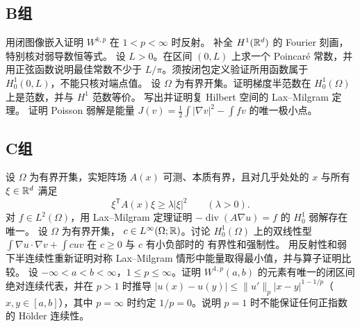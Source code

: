 \subsection*{B组}
\begin{enumerate}[label=\textbf{\thechapter.\arabic*.},resume]
用闭图像嵌入证明 \(W^{k,p}\) 在 \(1<p<\infty\) 时反射。
补全 \(H^1(\mathbb{R}^d)\) 的 Fourier 刻画，特别核对弱导数恒等式。
设 \(L>0\)。在区间 \((0,L)\) 上求一个 Poincaré 常数，并用正弦函数说明最佳常数不少于 \(L/\pi\)。须按闭包定义验证所用函数属于 \(H_0^1(0,L)\)，不能只核对端点值。
设 \(\Omega\) 为有界开集。证明梯度半范数在 \(H_0^1(\Omega)\) 上是范数，并与 \(H^1\) 范数等价。
写出并证明复 Hilbert 空间的 Lax--Milgram 定理。
证明 Poisson 弱解是能量 \(J(v)=\frac12\int|\nabla v|^2-\int fv\) 的唯一极小点。
\end{enumerate}
\subsection*{C组}
\begin{enumerate}[label=\textbf{\thechapter.\arabic*.},resume]
设 \(\Omega\) 为有界开集，实矩阵场 \(A(x)\) 可测、本质有界，且对几乎处处的 \(x\) 与所有 \(\xi\in\mathbb{R}^d\) 满足
\[
 \xi^{\mathsf T}A(x)\xi\ge\lambda|\xi|^2
 \qquad(\lambda>0).
\]
对 \(f\in L^2(\Omega)\)，用 Lax--Milgram 定理证明 \(-\operatorname{div}(A\nabla u)=f\) 的 \(H_0^1\) 弱解存在唯一。
设 \(\Omega\) 为有界开集，
\(c\in L^\infty(\Omega;\mathbb{R})\)。讨论 \(H_0^1(\Omega)\) 上的双线性型
\(\int\nabla u\cdot\nabla v+\int c uv\) 在 \(c\ge0\) 与 \(c\) 有小负部时的
有界性和强制性。
用反射性和弱下半连续性重新证明对称 Lax--Milgram 情形中能量取得最小值，并与算子证明比较。
设 \(-\infty<a<b<\infty\)，\(1\le p\le\infty\)。证明 \(W^{1,p}(a,b)\) 的元素有唯一的闭区间绝对连续代表，并在 \(p>1\) 时推导
\(|u(x)-u(y)|\le\|u'\|_p|x-y|^{1-1/p}\)（\(x,y\in[a,b]\)），其中 \(p=\infty\) 时约定 \(1/p=0\)。说明 \(p=1\) 时不能保证任何正指数的 Hölder 连续性。
\end{enumerate}
